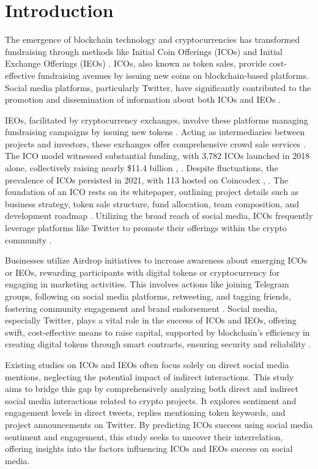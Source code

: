 \documentclass[runningheads]{llncs}
\begin{document}
\section{Introduction}

The emergence of blockchain technology and cryptocurrencies has transformed fundraising through methods like Initial Coin Offerings (ICOs) and Initial Exchange Offerings (IEOs) \cite{campino2021initial}. ICOs, also known as token sales, provide cost-effective fundraising avenues by issuing new coins on blockchain-based platforms. Social media platforms, particularly Twitter, have significantly contributed to the promotion and dissemination of information about both ICOs and IEOs \cite{tiwari2020future}.

IEOs, facilitated by cryptocurrency exchanges, involve these platforms managing fundraising campaigns by issuing new tokens \cite{chamorro2021financing}. Acting as intermediaries between projects and investors, these exchanges offer comprehensive crowd sale services \cite{vivion2020supporting}. The ICO model witnessed substantial funding, with 3,782 ICOs launched in 2018 alone, collectively raising nearly \$11.4 billion \cite{boreiko2019new}, \cite{giudici2019impact}. Despite fluctuations, the prevalence of ICOs persisted in 2021, with 113 hosted on Coincodex \cite{giudici2019impact}, \cite{daskalakis2020introduction}. The foundation of an ICO rests on its whitepaper, outlining project details such as business strategy, token sale structure, fund allocation, team composition, and development roadmap \cite{daskalakis2020introduction}. Utilizing the broad reach of social media, ICOs frequently leverage platforms like Twitter to promote their offerings within the crypto community \cite{drobetz2019investor}.

Businesses utilize Airdrop initiatives to increase awareness about emerging ICOs or IEOs, rewarding participants with digital tokens or cryptocurrency for engaging in marketing activities. This involves actions like joining Telegram groups, following on social media platforms, retweeting, and tagging friends, fostering community engagement and brand endorsement \cite{howell2020initial}. Social media, especially Twitter, plays a vital role in the success of ICOs and IEOs, offering swift, cost-effective means to raise capital, supported by blockchain's efficiency in creating digital tokens through smart contracts, ensuring security and reliability \cite{morkunas2019blockchain}.

Existing studies on ICOs and IEOs often focus solely on direct social media mentions, neglecting the potential impact of indirect interactions. This study aims to bridge this gap by comprehensively analyzing both direct and indirect social media interactions related to crypto projects. It explores sentiment and engagement levels in direct tweets, replies mentioning token keywords, and project announcements on Twitter. By predicting ICOs success using social media sentiment and engagement, this study seeks to uncover their interrelation, offering insights into the factors influencing ICOs and IEOs success on social media.
\end{document}
